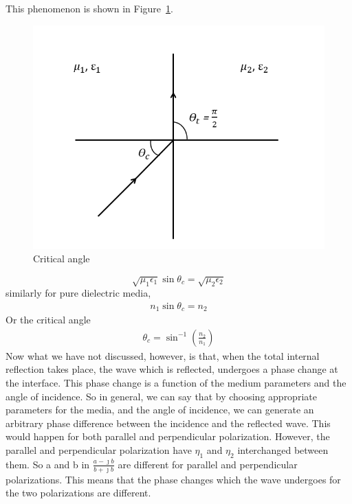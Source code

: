 \begin{enumerate}[(i)]
This phenomenon is shown in Figure~\ref {critical_angle}.
\begin{figure}[h]
\centering
\includegraphics[width=1\linewidth]{./graphics/critical_angle}
\caption{Critical angle}
\label{critical_angle}
\end{figure}

\begin{equation*}
\sqrt{\mu_1\epsilon_1} \sin\theta_c = \sqrt{\mu_2\epsilon_2}
\end{equation*}
similarly for pure dielectric media, 
\begin{align*}
n_1 \sin\theta_c = n_2
\end{align*}
Or the critical angle
\begin{align*}
\theta_c = \sin^{-1}(\frac{n_2}{n_1}) 
\end{align*}
Now what we have not discussed, however, is that, when the total internal reflection takes place, the wave which is reflected, undergoes a phase change at the interface. This phase change is a function of the medium parameters and the angle of incidence. So in general, we can say that by choosing appropriate parameters for the media, and the angle of incidence, we can generate an arbitrary phase difference between the incidence and the reflected wave. This would happen for both parallel and perpendicular polarization. However, the parallel and perpendicular polarization have $\eta_1$ and $\eta_2$
interchanged between them. So a and b in $\frac{a - \jmath b}{b + \jmath b}$ are different for parallel and perpendicular polarizations. This means that the phase changes which the wave undergoes for the two polarizations are different.


\end{enumerate}
